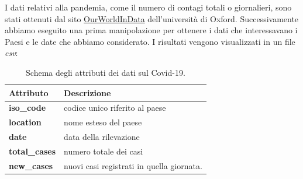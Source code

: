 I dati relativi alla pandemia, come il numero di contagi totali o giornalieri, sono stati ottenuti dal sito \href{https://ourworldindata.org/coronavirus-testing}{OurWorldInData} dell'università di Oxford. Successivamente abbiamo eseguito una prima manipolazione per ottenere i dati che interessavano i Paesi e le date che abbiamo considerato. I risultati vengono visualizzati in un file \textit{csv}:
\begin{table}[H]
	\centering
	\begin{tabular}{l|l}
		\textbf{Attributo} & \textbf{Descrizione} \\
		\hline
		\textbf{iso\_code} & codice unico riferito al paese \\\hline
		\textbf{location} & nome esteso del paese\\\hline
		\textbf{date} & data della rilevazione\\\hline
		\textbf{total\_cases} & numero totale dei casi\\\hline
		\textbf{new\_cases} & nuovi casi registrati in quella giornata.\\\hline

	\end{tabular}
	\caption{Schema degli attributi dei dati sul Covid-19.}
\end{table}

